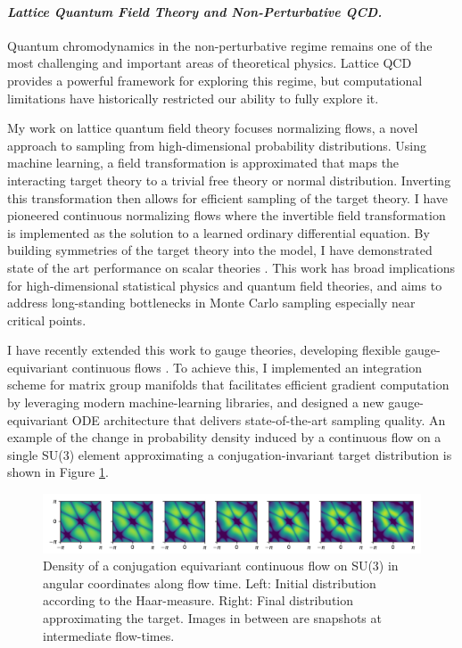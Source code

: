 \documentclass[11pt]{article}
\begin{document}
\paragraph{\textit{{Lattice Quantum Field Theory and Non-Perturbative QCD.}}}
Quantum chromodynamics in the non-perturbative regime remains one of the most challenging and important areas of theoretical physics.
Lattice QCD provides a powerful framework for exploring this regime, but computational limitations have historically restricted our ability to fully explore it.

My work on lattice quantum field theory focuses normalizing flows, a novel approach to sampling from high-dimensional probability distributions.
Using machine learning, a field transformation is approximated that maps the interacting target theory to a trivial free theory or normal distribution.
Inverting this transformation then allows for efficient sampling of the target theory.
I have pioneered continuous normalizing flows where the invertible field transformation is implemented as the solution to a learned ordinary differential equation. By building symmetries of the target theory into the model, I have demonstrated state of the art performance on scalar theories \cite{gerdes2023LearningLattice}. This work has broad implications for high-dimensional statistical physics and quantum field theories, and aims to address long-standing bottlenecks in Monte Carlo sampling especially near critical points.

I have recently extended this work to gauge theories, developing flexible gauge-equivariant continuous flows \cite{gerdes2024continuousGauge}.
To achieve this, I implemented an integration scheme for matrix group manifolds that facilitates efficient gradient computation by leveraging modern machine-learning libraries, and designed a new gauge-equivariant ODE architecture that delivers state-of-the-art sampling quality.
An example of the change in probability density induced by a continuous flow on a single SU(3) element approximating a conjugation-invariant target distribution is shown in Figure \ref{fig:su3}.

\begin{figure}
    \centering
    \includegraphics[width=\linewidth]{su3.pdf}
    \vspace{-25pt}
    \caption{ Density of a conjugation equivariant continuous flow on SU(3) in angular coordinates along flow time. Left: Initial distribution according to the Haar-measure. Right: Final distribution approximating the target. Images in between are snapshots at intermediate flow-times.}
    \label{fig:su3}
    \vspace{-10pt}
\end{figure}
\end{document}
